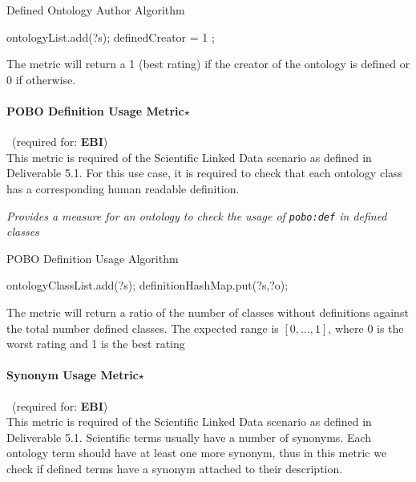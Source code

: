 \begin{algorithm}
\caption{Defined Ontology Author Algorithm}
\begin{algorithmic}[1]
 ontologyList.add(?s); \EndIf
{} definedCreator = 1 ; \EndIf
\EndProcedure
\end{algorithmic}
\end{algorithm}

The metric will return a 1 (best rating) if the creator of the ontology is defined or 0 if otherwise.

\paragraph{POBO Definition Usage Metric$\star$}~(required for: \textbf{EBI})~\\ 
This metric is required of the Scientific Linked Data scenario as defined in Deliverable 5.1.
For this use case, it is required to check that each ontology class has a corresponding human readable definition.

\begin{mdframed}[style=metricdefinition]
\emph{Provides a measure for an ontology to check the usage of \texttt{pobo:def} in defined classes}
\end{mdframed}

\begin{algorithm}
\caption{POBO Definition Usage Algorithm}
\begin{algorithmic}[1]
 ontologyClassList.add(?s); \EndIf
{} 
\State definitionHashMap.put(?s,?o);
\EndIf
\EndProcedure
\end{algorithmic}
\end{algorithm}

The metric will return a ratio of the number of classes without definitions against the total number defined classes. The expected range is $[0,\ldots,1]$, where 0 is the worst rating and 1 is the best rating

\paragraph{Synonym Usage Metric$\star$}~(required for: \textbf{EBI})~\\ 
This metric is required of the Scientific Linked Data scenario as defined in Deliverable 5.1.
Scientific terms usually have a number of synonyms.
Each ontology term should have at least one more synonym, thus in this metric we check if defined terms have a synonym attached to their description.

